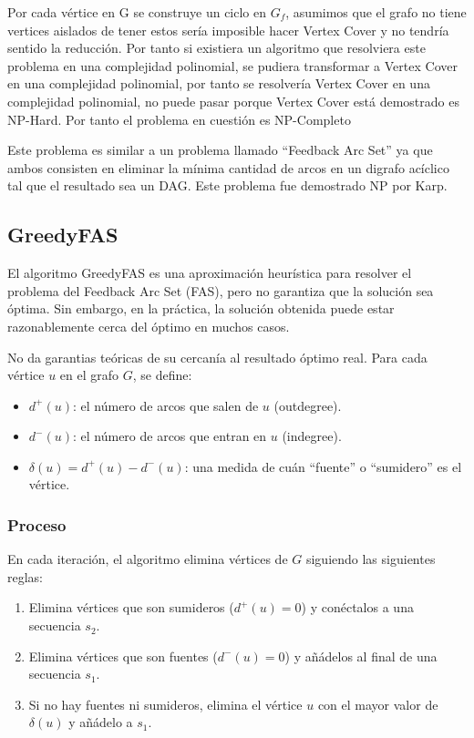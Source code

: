 \documentclass{article}
\begin{document}
Por cada vértice en G se construye un ciclo en $G_f$, asumimos que el grafo no tiene vertices aislados de tener estos sería imposible hacer Vertex Cover y no tendría sentido la reducción. Por tanto si existiera un algoritmo que resolviera este problema en una complejidad polinomial, se pudiera transformar a Vertex Cover en una complejidad polinomial, por tanto se resolvería Vertex Cover en una complejidad polinomial, no puede pasar porque Vertex Cover está demostrado es NP-Hard. Por tanto el problema en cuestión es NP-Completo

Este problema es similar a un problema llamado ``Feedback Arc Set'' ya que ambos consisten en eliminar la mínima cantidad de arcos en un digrafo acíclico tal que el resultado sea un DAG. Este problema fue demostrado NP por Karp.

\subsection{GreedyFAS}
El algoritmo GreedyFAS es una aproximación heurística para resolver el problema del Feedback Arc Set (FAS), pero no garantiza que la solución sea óptima. Sin embargo, en la práctica, la solución obtenida puede estar razonablemente cerca del óptimo en muchos casos.

No da garantias teóricas de su cercanía al resultado óptimo real.
Para cada vértice $u$ en el grafo $G$, se define:

\begin{itemize}
    \item $d^+(u)$: el número de arcos que salen de $u$ (outdegree).
    \item $d^-(u)$: el número de arcos que entran en $u$ (indegree).
    \item $\delta(u) = d^+(u) - d^-(u)$: una medida de cuán ``fuente'' o ``sumidero'' es el vértice.
\end{itemize}

\subsubsection{Proceso}

En cada iteración, el algoritmo elimina vértices de $G$ siguiendo las siguientes reglas:

\begin{enumerate}
    \item Elimina vértices que son sumideros ($d^+(u) = 0$) y conéctalos a una secuencia $s_2$.
    \item Elimina vértices que son fuentes ($d^-(u) = 0$) y añádelos al final de una secuencia $s_1$.
    \item Si no hay fuentes ni sumideros, elimina el vértice $u$ con el mayor valor de $\delta(u)$ y añádelo a $s_1$.
\end{enumerate}
\end{document}
